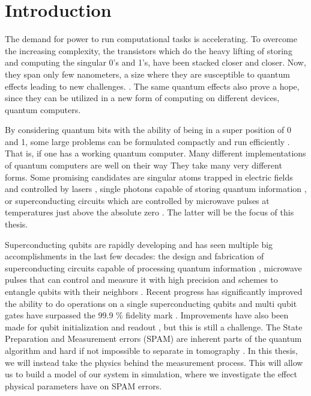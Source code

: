 \chapter{Introduction}\label{chap:Introduction}
The demand for power to run computational tasks is accelerating. To overcome the increasing complexity, the transistors which do the heavy lifting of storing and computing the singular 0's and 1's, have been stacked closer and closer. Now, they span only few nanometers, a size where they are susceptible to quantum effects leading to new challenges. \cite{morton_embracing_2011}. The same quantum effects also prove a hope, since they can be utilized in a new form of computing on different devices, quantum computers. 

By considering quantum bits with the ability of being in a super position of 0 and 1, some large problems can be formulated compactly and run efficiently \cite{preskill_quantum_2018}. That is, if one has a working quantum computer. Many different implementations of quantum computers are well on their way They take many very different forms. Some promising candidates are  singular atoms trapped in electric fields and controlled by lasers \cite{brown_co-designing_2016}, single photons capable of storing quantum information \cite{obrien_optical_2007}, or superconducting circuits which are controlled by microwave pulses at temperatures just above the absolute zero \cite{krantz_quantum_2019}. The latter will be the focus of this thesis. 

Superconducting qubits are rapidly developing and has seen multiple big accomplishments in the last few decades: the design and fabrication of superconducting circuits capable of processing quantum information \cite{koch_charge_2007, manucharyan_fluxonium_2009}, microwave pulses that can control and measure it with high precision \cite{motzoi_simple_2009, walter_rapid_2017} and schemes to entangle qubits with their neighbors \cite{yan_tunable_2018}. Recent progress has significantly improved the ability to do operations on a single superconducting qubits \cite{barends_superconducting_2014} and multi qubit gates have surpassed the 99.9 \% fidelity mark \cite{ding_high-fidelity_2023}. Improvements have also been made for qubit initialization and readout \cite{walter_rapid_2017, swiadek_enhancing_2023}, but this is still a challenge. The State Preparation and Measurement errors (SPAM) are inherent parts of the quantum algorithm and hard if not impossible to separate in tomography \cite{lin_independent_2021}. In this thesis, we will instead take the physics behind the measurement process. This will allow us to build a model of our system in simulation, where we investigate the effect physical parameters have on SPAM errors. 


